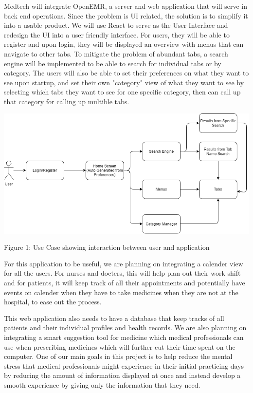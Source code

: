 Medtech will integrate OpenEMR, a server and web application that will serve in back end operations. Since the problem is UI related, the solution is to simplify it into a usable product. We will use React to serve as the User Interface and redesign the UI into a user friendly interface. For users, they will be able to register and upon login, they will be displayed an overview with menus that can navigate to other tabs. To mitigate the problem of abundant tabs, a search engine will be implemented to be able to search for individual tabs or by category. The users will also be able to set their preferences on what they want to see upon startup, and set their own "category" view of what they want to see by selecting which tabs they want to see for one specific category, then can call up that category for calling up multible tabs.

\includegraphics[width=1\textwidth]{images/use case 1.png}


Figure 1: Use Case showing interaction between user and application


For this application to be useful, we are planning on integrating a calender view for all the users. For nurses and docters, this will help plan out their work shift and for patients, it will keep track of all their appointments and potentially have events on calender when they have to take medicines when they are not at the hospital, to ease out the process.

This web application also needs to have a database that keep tracks of all patients and their individual profiles and health records. We are also planning on integrating a smart suggestion tool for medicine which medical professionals can use when prescribing medicines which will further cut their time spent on the computer. One of our main goals in this project is to help reduce the mental stress that medical professionals might experience in their initial practicing days by reducing the amount of information displayed at once and instead develop a smooth experience by giving only the information that they need.

